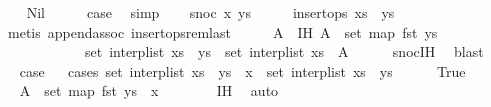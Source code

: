 \begin{isabellebody}
\ \ \isamarkupfalse%
\ Nil\isanewline
\ \ \isamarkupfalse%
\ \isamarkupfalse%
\ {\isacharquery}case\ \isamarkupfalse%
\ simp\isanewline
{}\isamarkupfalse%
\isanewline
\ \ \isamarkupfalse%
\ {\isacharparenleft}snoc\ x\ ys{\isacharparenright}\isanewline
\ \ \isamarkupfalse%
\ \isamarkupfalse%
\ {\isachardoublequoteopen}insert{\isacharunderscore}ops\ {\isacharparenleft}xs\ {\isacharat}\ ys{\isacharparenright}{\isachardoublequoteclose}\isanewline
\ \ \ \ \isamarkupfalse%
\ {\isacharparenleft}metis\ append{\isacharunderscore}assoc\ insert{\isacharunderscore}ops{\isacharunderscore}rem{\isacharunderscore}last{\isacharparenright}\isanewline
\ \ \isamarkupfalse%
\ \isamarkupfalse%
\ A\ \ IH{\isacharcolon}\ {\isachardoublequoteopen}A\ {\isasymsubseteq}\ set\ {\isacharparenleft}map\ fst\ ys{\isacharparenright}\ {\isasymand}\isanewline
\ \ \ \ \ \ \ \ \ \ \ \ set\ {\isacharparenleft}interp{\isacharunderscore}list\ {\isacharparenleft}xs\ {\isacharat}\ ys{\isacharparenright}{\isacharparenright}\ {\isacharequal}\ set\ {\isacharparenleft}interp{\isacharunderscore}list\ xs{\isacharparenright}\ {\isasymunion}\ A{\isachardoublequoteclose}\isanewline
\ \ \ \ \isamarkupfalse%
\ snoc{\isachardot}IH\ \isamarkupfalse%
\ blast\isanewline
\ \ \isamarkupfalse%
\ \isamarkupfalse%
\ {\isacharquery}case\isanewline
\ \ \isamarkupfalse%
{\isacharparenleft}cases\ {\isachardoublequoteopen}set\ {\isacharparenleft}interp{\isacharunderscore}list\ {\isacharparenleft}xs\ {\isacharat}\ ys\ {\isacharat}\ {\isacharbrackleft}x{\isacharbrackright}{\isacharparenright}{\isacharparenright}\ {\isacharequal}\ set\ {\isacharparenleft}interp{\isacharunderscore}list\ {\isacharparenleft}xs\ {\isacharat}\ ys{\isacharparenright}{\isacharparenright}{\isachardoublequoteclose}{\isacharparenright}\isanewline
\ \ \ \ \isamarkupfalse%
\ True\isanewline
\ \ \ \ \isamarkupfalse%
\ \isamarkupfalse%
\ {\isachardoublequoteopen}A\ {\isasymsubseteq}\ set\ {\isacharparenleft}map\ fst\ {\isacharparenleft}ys\ {\isacharat}\ {\isacharbrackleft}x{\isacharbrackright}{\isacharparenright}{\isacharparenright}{\isachardoublequoteclose}\isanewline
\ \ \ \ \ \ \isamarkupfalse%
\ IH\ \isamarkupfalse%
\ auto\isanewline
\ \ \ \ \isamarkupfalse%
\ \isamarkupfalse%

\end{isabellebody}
